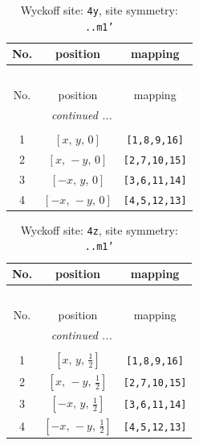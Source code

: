 \documentclass[fleqn,8pt]{jsarticle}
\begin{document}
\renewcommand{\arraystretch}{1.2}
\begin{longtable}{ccc}
\caption{Wyckoff site: {\tt 4y}, site symmetry: {\tt ..m1'}}
 \\
 \hline \hline
No. & position & mapping \\ \hline \endfirsthead

\multicolumn{2}{l}{\tablename\ \thetable{}} \\
 \hline \hline
No. & position & mapping \\ \hline \endhead

 \hline \hline
\multicolumn{2}{r}{\footnotesize\it continued ...} \\ \endfoot

 \hline \hline
\multicolumn{2}{r}{} \\ \endlastfoot

1 & $\left[ x,\, y,\, 0 \right]$ & {\tt [1,8,9,16]} \\ \hline
2 & $\left[ x,\, - y,\, 0 \right]$ & {\tt [2,7,10,15]} \\ \hline
3 & $\left[ - x,\, y,\, 0 \right]$ & {\tt [3,6,11,14]} \\ \hline
4 & $\left[ - x,\, - y,\, 0 \right]$ & {\tt [4,5,12,13]} \\
\end{longtable}
\renewcommand{\arraystretch}{1.2}
\begin{longtable}{ccc}
\caption{Wyckoff site: {\tt 4z}, site symmetry: {\tt ..m1'}}
 \\
 \hline \hline
No. & position & mapping \\ \hline \endfirsthead

\multicolumn{2}{l}{\tablename\ \thetable{}} \\
 \hline \hline
No. & position & mapping \\ \hline \endhead

 \hline \hline
\multicolumn{2}{r}{\footnotesize\it continued ...} \\ \endfoot

 \hline \hline
\multicolumn{2}{r}{} \\ \endlastfoot

1 & $\left[ x,\, y,\, \frac{1}{2} \right]$ & {\tt [1,8,9,16]} \\ \hline
2 & $\left[ x,\, - y,\, \frac{1}{2} \right]$ & {\tt [2,7,10,15]} \\ \hline
3 & $\left[ - x,\, y,\, \frac{1}{2} \right]$ & {\tt [3,6,11,14]} \\ \hline
4 & $\left[ - x,\, - y,\, \frac{1}{2} \right]$ & {\tt [4,5,12,13]} \\
\end{longtable}
\end{document}
